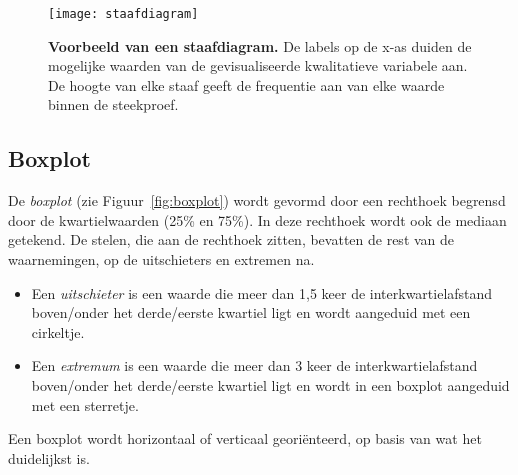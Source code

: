 \begin{figure}
  \centering
  \texttt{[image: staafdiagram]}
  \caption[Voorbeeld van een staafdiagram]{\textbf{Voorbeeld van een staafdiagram.} De labels op de x-as duiden de mogelijke waarden van de gevisualiseerde kwalitatieve variabele aan. De hoogte van elke staaf geeft de frequentie aan van elke waarde binnen de steekproef.}
  \label{fig:staafdiagram}
\end{figure}

\subsection{Boxplot}

De \emph{boxplot} (zie Figuur~\ref{fig:boxplot}) wordt gevormd door een rechthoek begrensd door de kwartielwaarden (25\% en 75\%). In deze rechthoek wordt ook de mediaan getekend. De stelen, die aan de rechthoek zitten, bevatten de rest van de waarnemingen, op de uitschieters en extremen na.

\begin{itemize}
  \item Een \textit{uitschieter} is een waarde die meer dan 1,5 keer de interkwartielafstand boven/onder het derde/eerste kwartiel ligt en wordt aangeduid met een cirkeltje.
  \item Een \textit{extremum} is een waarde die meer dan 3 keer de interkwartielafstand boven/onder het derde/eerste kwartiel ligt en wordt in een boxplot aangeduid met een sterretje.
\end{itemize}

Een boxplot wordt horizontaal of verticaal georiënteerd, op basis van wat het duidelijkst is.


